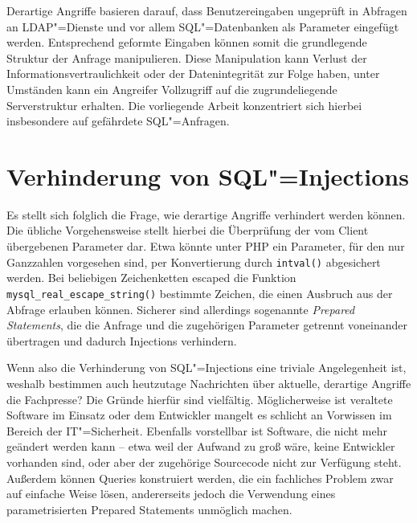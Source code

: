 Derartige Angriffe basieren darauf, dass Benutzereingaben ungeprüft in Abfragen an LDAP"=Dienste und vor allem SQL"=Datenbanken als Parameter eingefügt werden. Entsprechend geformte Eingaben können somit die grundlegende Struktur der Anfrage manipulieren. Diese Manipulation kann Verlust der Informationsvertraulichkeit oder der Datenintegrität zur Folge haben, unter Umständen kann ein Angreifer Vollzugriff auf die zugrundeliegende Serverstruktur erhalten. Die vorliegende Arbeit konzentriert sich hierbei insbesondere auf gefährdete SQL"=Anfragen.

\section{Verhinderung von SQL"=Injections}

Es stellt sich folglich die Frage, wie derartige Angriffe verhindert werden können. Die übliche Vorgehensweise stellt hierbei die Überprüfung der vom Client übergebenen Parameter dar. Etwa könnte unter PHP ein Parameter, für den nur Ganzzahlen vorgesehen sind, per Konvertierung durch \texttt{intval()} abgesichert werden. Bei beliebigen Zeichenketten escaped die Funktion \texttt{mysql_real_escape_string()} bestimmte Zeichen, die einen Ausbruch aus der Abfrage erlauben können. Sicherer sind allerdings sogenannte \emph{Prepared Statements}, die die Anfrage und die zugehörigen Parameter getrennt voneinander übertragen und dadurch Injections verhindern.

Wenn also die Verhinderung von SQL"=Injections eine triviale Angelegenheit ist, weshalb bestimmen auch heutzutage Nachrichten über aktuelle, derartige Angriffe die Fachpresse? Die Gründe hierfür sind vielfältig. Möglicherweise ist veraltete Software im Einsatz oder dem Entwickler mangelt es schlicht an Vorwissen im Bereich der IT"=Sicherheit.  Ebenfalls vorstellbar ist Software, die nicht mehr geändert werden kann -- etwa weil der Aufwand zu groß wäre, keine Entwickler vorhanden sind, oder aber der zugehörige Sourcecode nicht zur Verfügung steht. Außerdem können Queries konstruiert werden, die ein fachliches Problem zwar auf einfache Weise lösen, andererseits jedoch die Verwendung eines parametrisierten Prepared Statements unmöglich machen.

